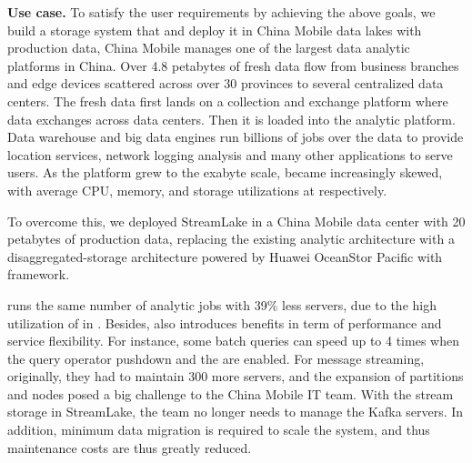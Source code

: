 \noindent \textbf{Use case.} To satisfy the user requirements by achieving the above goals, we build a storage system \sys that  and deploy it in China Mobile data lakes with production data,   China Mobile manages one of the largest data analytic platforms in China.
Over 4.8 petabytes  of fresh data flow from business branches and edge devices scattered across over 30 provinces to several centralized data centers. The fresh data first lands on a collection and exchange platform where data exchanges across data centers. Then it is loaded into the analytic platform. Data warehouse and big data engines run billions of jobs  over the data to provide location services, network logging analysis and many other applications to serve users.
As the platform grew to the exabyte scale,  became increasingly skewed, with average CPU, memory, and storage utilizations at  respectively.




To overcome this, we deployed StreamLake in a China Mobile data center with 20 petabytes of production data, replacing the existing analytic architecture with a disaggregated-storage architecture powered by Huawei OceanStor Pacific with  \sys framework.

\sys runs the same number of analytic jobs with 39\% less servers, due to the high utilization of  in \sys. Besides, \sys also introduces  benefits in term of performance and service flexibility. For instance, some batch queries can speed up to 4 times when the query operator pushdown and the \brain are enabled. 
For message streaming, originally, they had to maintain 300 more \kafka servers, and the expansion of partitions and nodes posed a big challenge to the China Mobile IT team. With the stream storage in StreamLake, the team no longer needs to  manage the Kafka servers. In addition, minimum data migration is required to scale the system, and thus maintenance costs are thus greatly reduced. 




 
 
 
 

